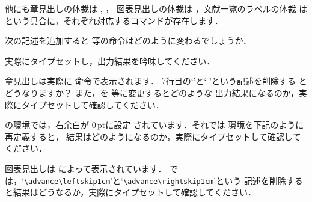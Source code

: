 他にも章見出しの体裁は , ，
図表見出しの体裁は ，文献一覧のラベルの体裁
は という具合に，それぞれ対応するコマンドが存在します．

\begin{Prob}
次の記述を追加すると 等の命令はどのように変わるでしょうか．

\begin{InTeX}
\renewcommand\@seccntformat[1]{\@nameuse{the#1}.\quad}
\end{InTeX}

実際にタイプセットし，出力結果を吟味してください．
\end{Prob}

\begin{Prob}
章見出しは実際に  命令で表示されます．
7行目の`'と` 'という記述を削除する
とどうなりますか？
また，を 等に変更するとどのような
出力結果になるのか，実際にタイプセットして確認してください．

\begin{InTeX}
\def\@makechapterhead#1{%
  \vspace*{2\Cvs}%
  {\parindent \z@ \raggedright \normalfont
    \ifnum \c@secnumdepth >\m@ne
      \if@mainmatter
        \huge\headfont \@chapapp\thechapter\@chappos
        \par\nobreak
        \vskip \Cvs %
      \fi
    \fi
    \interlinepenalty\@M
    \Huge \headfont #1\par\nobreak
    \vskip 3\Cvs}} %
\end{InTeX}

\end{Prob}

\begin{Prob}
の環境では，右余白が 0\,ptに設定
されています．それでは 環境を下記のように再定義すると，
結果はどのようになるのか，実際にタイプセットして確認してください．

\begin{InTeX}
\renewenvironment{quotation}{%
  \list{}{%
    \listparindent\parindent
    \itemindent\listparindent
    \rightmargin = \leftmargin}%
  \item\relax}{\endlist}
\end{InTeX}
\end{Prob}

\begin{Prob}
図表見出しは  によって表示されています．
では，`\verb|\advance\leftskip1cm|'と`\verb|\advance\rightskip1cm|'という
記述を削除すると結果はどうなるか，実際にタイプセットして確認してください．

\begin{InTeX}
\long{} 
\end{InTeX}
\end{Prob}

